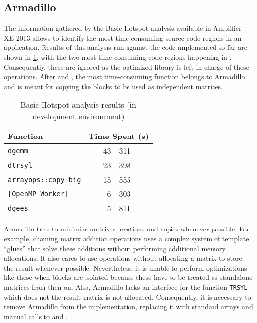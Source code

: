 \documentclass[../thesis]{subfiles}
\begin{document}
	\subsection{Armadillo}
	\label{subsec:mic:optims:arma}

	The information gathered by the Basic Hotspot analysis available in \intel\vtune Amplifier XE 2013 allows to identify the most time-consuming source code regions in an application. Results of this analysis run against the code implemented so far are shown in \cref{tab:hotspots}, with the two most time-consuming code regions happening in \mkl. Consequently, these are ignored as the optimized library is left in charge of these operations. After \blas and \lapack, the most time-consuming function belongs to Armadillo, and is meant for copying the blocks to be used as independent matrices.

	\begin{table}[htp]
		\begin{center}
			\begin{tabular}{l|r@{.}l}
				\hline
				Function & \multicolumn{2}{c}{Time Spent (s)} \\
				\hline
				\texttt{dgemm} & 43 & 311  \\
				\texttt{dtrsyl} & 23 & 398  \\
				\texttt{arrayops::copy\_big} & 15 & 555  \\
				\texttt{[OpenMP Worker]} & 6 & 303  \\
				\texttt{dgees} & 5 & 811  \\
				\hline
			\end{tabular}
		\end{center}
		\caption[Basic Hotspot analysis results]{Basic Hotspot analysis results (in development environment)}
		\label{tab:hotspots}
	\end{table}

	Armadillo tries to minimize matrix allocations and copies whenever possible. For example, chaining matrix addition operations uses a complex system of template ``glues'' that solve these additions without performing additional memory allocations. It also cares to use \blas operations without allocating a matrix to store the result whenever possible. Nevertheless, it is unable to perform optimizations like these when blocks are isolated because these have to be treated as standalone matrices from then on. Also, Armadillo lacks an interface for the \lapack function \texttt{TRSYL} which does not the result matrix is not allocated. Consequently, it is necessary to remove Armadillo from the implementation, replacing it with standard arrays and manual calls to \blas and \lapack.
\end{document}
